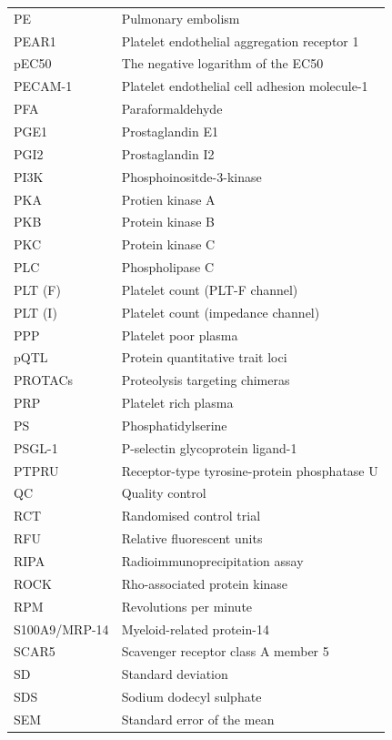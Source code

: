 \documentclass[11pt,twoside]{bristolthesis}
\begin{document}
\begin{abbreviations}
\begin{longtable}[t]{ll}
    PE & Pulmonary embolism\\
    PEAR1 & Platelet endothelial aggregation receptor 1\\
    pEC50 & The negative logarithm of the EC50\\
    PECAM-1 & Platelet endothelial cell adhesion molecule-1\\
    \addlinespace
    PFA & Paraformaldehyde\\
    PGE1 & Prostaglandin E1\\
    PGI2 & Prostaglandin I2\\
    PI3K & Phosphoinositde-3-kinase\\
    PKA & Protien kinase A\\
    \addlinespace
    PKB & Protein kinase B\\
    PKC & Protein kinase C\\
    PLC & Phospholipase C\\
    PLT (F) & Platelet count (PLT-F channel)\\
    PLT (I) & Platelet count (impedance channel)\\
    \addlinespace
    PPP & Platelet poor plasma\\
    pQTL & Protein quantitative trait loci\\
    PROTACs & Proteolysis targeting chimeras\\
    PRP & Platelet rich plasma\\
    PS & Phosphatidylserine\\
    \addlinespace
    PSGL-1 & P-selectin glycoprotein ligand-1\\
    PTPRU & Receptor-type tyrosine-protein phosphatase U\\
    QC & Quality control\\
    RCT & Randomised control trial\\
    RFU & Relative fluorescent units\\
    \addlinespace
    RIPA & Radioimmunoprecipitation assay\\
    ROCK & Rho-associated protein kinase\\
    RPM & Revolutions per minute\\
    S100A9/MRP-14 & Myeloid-related protein-14\\
    SCAR5 & Scavenger receptor class A member 5\\
    \addlinespace
    SD & Standard deviation\\
    SDS & Sodium dodecyl sulphate\\
    SEM & Standard error of the mean\\

\end{longtable}
\end{abbreviations}
\end{document}
